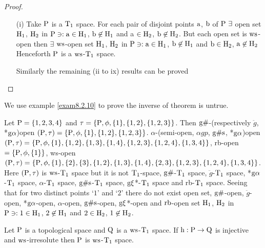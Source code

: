 \begin{proof}
\begin{itemize}
\item[(i)] Take $\mathrm{P}$ is a $\mathrm{T}_{1}$ space. For each pair of disjoint points $\mathrm{a}$, $\mathrm{b}$ of $\TSP \ \exists$  open set $\mathrm{H}_{1}$, $\mathrm{H}_{2}$ in $\mathrm{P} \ni: \mathrm{a} \in \mathrm{H}_{1}$, $\mathrm{b} \not\in \mathrm{H}_{1}$ and a $\in \mathrm{H}_{2}$, $\mathrm{b} \not\in \mathrm{H}_{2}$. But each open set is $\mathrm{ws}$-open then $\exists$  $\mathrm{ws}$-open set $\mathrm{H}_{1}$, $\mathrm{H}_{2}$ in $\mathrm{P} \ni: \mathrm{a} \in \mathrm{H}_{1}$, $\mathrm{b} \not\in \mathrm{H}_{1}$ and $\mathrm{b} \in \mathrm{H}_{2}$, $\mathrm{a} \not\in \mathrm{H}_{2}$ Henceforth $\mathrm{P}$ is a $\mathrm{ws}$-$\mathrm{T}_{1}$ space.

Similarly the remaining (ii to ix) results can be proved
\end{itemize}
\end{proof}

We use example \ref{exam8.2.10} to prove the inverse of theorem is untrue.

\begin{exm}\label{exam8.2.10}
Let $\mathrm{P}= \{1,2,3,4\}$ and $\tau =\{\mathrm{P}, \phi, \{1\}, \{1, 2\},\{1, 2, 3\}\}$. Then $\mathrm{g}\#$-(respectively $\ddot{g}$, *$\mathrm{g}\alpha$)open $(\mathrm{P}, \tau)=\{\mathrm{P}, \phi, \{1\}, \{1,2\},\{1, 2 ,3\}\}$. $\alpha$-(semi-open, $\alpha gp$, $\mathrm{g}\#\mathrm{s}$, *$\mathrm{g}\alpha$)open $(\mathrm{P}, \tau)=\{\mathrm{P}, \phi, \{1\}, \{1, 2\},\{1, 3\},\{1, 4\},\{1, 2, 3\},\{1, 2, 4\},\{1, 3, 4\}\}$, rb-open$=\{\mathrm{P}, \phi, \{1\}\}$, ws-open $(\TSP, \tau)=\{\TSP, \phi, \{1\},\{2\},\{3\},\{1, 2\},\{1, 3\},\{1, 4\},\break \{2 ,3\},\{1, 2, 3\},\{1, 2, 4\},\{1, 3, 4\}\}$. Here $(\mathrm{P}, \tau)$ is $\mathrm{ws}$-$\mathrm{T}_{1}$ space but it is not $\mathrm{T}_{1}$-space, $\mathrm{g}\#$-$\mathrm{T}_{1}$ space, $\ddot{g}$-$\mathrm{T}_{1}$ space, *$\mathrm{g}\alpha$-$\mathrm{T}_{1}$ space, $\alpha$-$\mathrm{T}_{1}$ space, $\mathrm{g}\#\mathrm{s}$-$\mathrm{T}_{1}$ space, $\mathrm{g}\xi$*-$\mathrm{T}_{1}$ space and rb-$\mathrm{T}_{1}$ space. Seeing that for two distinct points `$1$' and `$2$' there do not exist open set, $\mathrm{g}\#$-open, $\ddot{g}$-open, *$\mathrm{g}\alpha$-open, $\alpha$-open, $\mathrm{g}\#\mathrm{s}$-open, $\mathrm{g}\xi$*-open and $\mathrm{rb}$-open set $\mathrm{H}_{1}$, $\mathrm{H}_{2}$ in $\mathrm{P} \ni: 1 \in \mathrm{H}_{1}$, $2 \not\in \mathrm{H}_{1}$ and $2 \in \mathrm{H}_{2}$, $1 \not\in \mathrm{H}_{2}$.
\end{exm}

\begin{thm}\label{thm8.2.11}
Let $\mathrm{P}$ is a topological space and $\mathrm{Q}$ is a $\mathrm{ws}$-$\mathrm{T}_{1}$ space. If $\mathrm{h}: \mathrm{P} \to \mathrm{Q}$ is injective and $\mathrm{ws}$-irresolute then $\mathrm{P}$ is $\mathrm{ws}$-$\mathrm{T}_{1}$ space.
\end{thm}

